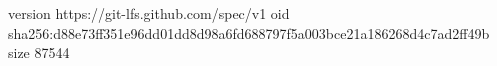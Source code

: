 version https://git-lfs.github.com/spec/v1
oid sha256:d88e73ff351e96dd01dd8d98a6fd688797f5a003bce21a186268d4c7ad2ff49b
size 87544
